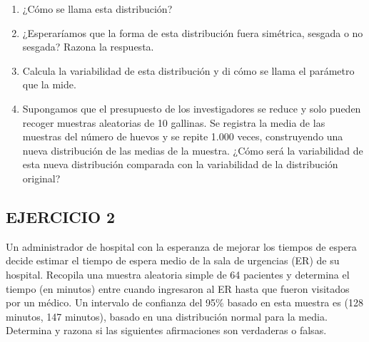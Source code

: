 \documentclass[
]{article}
\providecommand{\tightlist}{%
  \setlength{\itemsep}{0pt}\setlength{\parskip}{0pt}}
\begin{document}
\begin{enumerate}
\def\labelenumi{\alph{enumi})}
\tightlist
\item
  ¿Cómo se llama esta distribución?\\
\item
  ¿Esperaríamos que la forma de esta distribución fuera simétrica, sesgada o no sesgada? Razona la respuesta.\\
\item
  Calcula la variabilidad de esta distribución y di cómo se llama el parámetro que la mide.\\
\item
  Supongamos que el presupuesto de los investigadores se reduce y solo pueden recoger muestras aleatorias de 10 gallinas. Se registra la media de las muestras del número de huevos y se repite 1.000 veces, construyendo una nueva distribución de las medias de la muestra. ¿Cómo será la variabilidad de esta nueva distribución comparada con la variabilidad de la distribución original?
\end{enumerate}

\subsection{EJERCICIO 2}\label{ejercicio-2-3}

Un administrador de hospital con la esperanza de mejorar los tiempos de espera decide estimar el tiempo de espera medio de la sala de urgencias (ER) de su hospital. Recopila una muestra aleatoria simple de 64 pacientes y determina el tiempo (en minutos) entre cuando ingresaron al ER hasta que fueron visitados por un médico. Un intervalo de confianza del 95\% basado en esta muestra es (128 minutos, 147 minutos), basado en una distribución normal para la media. Determina y razona si las siguientes afirmaciones son verdaderas o falsas.
\end{document}
